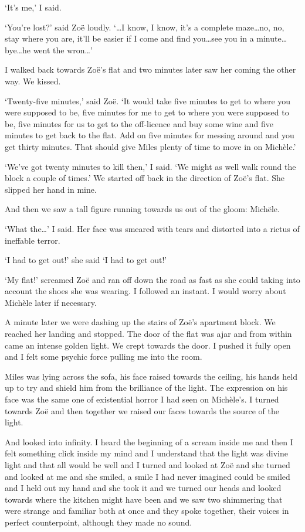`It's me,' I said.

`You're lost?' said Zoë loudly. `\dots I know, I know, it's a
complete maze\dots no, no, stay where you are, it'll be easier if I
come and find you\dots see you in a minute\dots bye\dots he went the
wron\dots'

I walked back towards Zoë's flat and two minutes later saw her
coming the other way. We kissed.

`Twenty-five minutes,' said Zoë. `It would take five minutes to get to
where you were supposed to be, five minutes for me to get to where
you were supposed to be, five minutes for us to get to the
off-licence and buy some wine and five minutes to get back to the
flat. Add on five minutes for messing around and you get thirty
minutes. That should give Miles plenty of time to move in on
Michèle.'

`We've got twenty minutes to kill then,' I said. `We might as well
walk round the block a couple of times.' We started off back in the
direction of Zoë's flat. She slipped her hand in mine.

And then we saw a tall figure running towards us out of the gloom:
Michële.

`What the\dots' I said. Her face was smeared with tears and
distorted into a rictus of ineffable terror.

`I had to get out!' she said `I had to get out!'

`My flat!' screamed Zoë and ran off down the road as fast as she
could taking into account the shoes she was wearing. I followed an
instant. I would worry about Michèle later if necessary.

A minute later we were dashing up the stairs of Zoë's apartment
block. We reached her landing and stopped. The door of the flat was
ajar and from within came an intense golden light. We crept towards
the door. I pushed it fully open and I felt some psychic force
pulling me into the room.

Miles was lying across the sofa, his face raised towards the
ceiling, his hands held up to try and shield him from the brilliance
of the light. The expression on his face was the same one of
existential horror I had seen on Michèle's. I turned towards
Zoë and then together we raised our faces towards the source of
the light.

And looked into infinity. I heard the beginning of a scream inside
me and then I felt something {\twelveit click\/} inside my mind and
I understand that the light was divine light and that all would be
well and I turned and looked at Zoë and she turned and looked at
me and she smiled, a smile I had never imagined could be smiled and
I held out my hand and she took it and we turned our heads and
looked towards where the kitchen might have been and we saw two
shimmering that were strange and familiar both at once and they
spoke together, their voices in perfect counterpoint, although they
made no sound.

